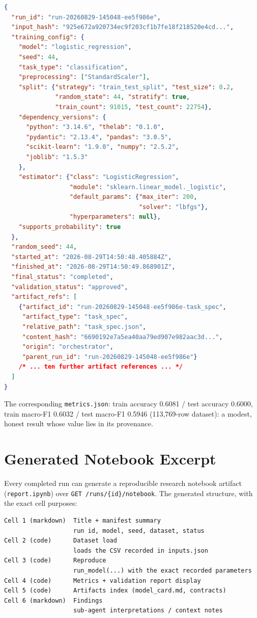 \begin{lstlisting}[language=json, caption={Real \texttt{manifest.json} (abridged).}, label={lst:anxmanifest}, style=cli]
{
  "run_id": "run-20260829-145048-ee5f986e",
  "input_hash": "925e672a920734ec9f203cf1b7fe18f218520e4cd...",
  "training_config": {
    "model": "logistic_regression",
    "seed": 44,
    "task_type": "classification",
    "preprocessing": ["StandardScaler"],
    "split": {"strategy": "train_test_split", "test_size": 0.2,
              "random_state": 44, "stratify": true,
              "train_count": 91015, "test_count": 22754},
    "dependency_versions": {
      "python": "3.14.6", "thelab": "0.1.0",
      "pydantic": "2.13.4", "pandas": "3.0.5",
      "scikit-learn": "1.9.0", "numpy": "2.5.2",
      "joblib": "1.5.3"
    },
    "estimator": {"class": "LogisticRegression",
                  "module": "sklearn.linear_model._logistic",
                  "default_params": {"max_iter": 200,
                                     "solver": "lbfgs"},
                  "hyperparameters": null},
    "supports_probability": true
  },
  "random_seed": 44,
  "started_at": "2026-08-29T14:50:48.405884Z",
  "finished_at": "2026-08-29T14:50:49.868901Z",
  "final_status": "completed",
  "validation_status": "approved",
  "artifact_refs": [
    {"artifact_id": "run-20260829-145048-ee5f986e-task_spec",
     "artifact_type": "task_spec",
     "relative_path": "task_spec.json",
     "content_hash": "6690192e7a5ea40aa79ed907e982aac3d...",
     "origin": "orchestrator",
     "parent_run_id": "run-20260829-145048-ee5f986e"}
    /* ... ten further artifact references ... */
  ]
}
\end{lstlisting}

The corresponding \texttt{metrics.json}: train accuracy 0.6081 / test accuracy 0.6000, train macro-F1 0.6032 / test macro-F1 0.5946 (113{,}769-row dataset): a modest, honest result whose value lies in its provenance.

\chapter{Generated Notebook Excerpt}
\label{anx:notebook}

Every completed run can generate a reproducible research notebook artifact (\texttt{report.}\allowbreak{}\texttt{ipynb}) over \texttt{GET /runs/}\allowbreak{}\texttt{\{id\}/}\allowbreak{}\texttt{notebook}. The generated structure, with the exact cell purposes:

\begin{lstlisting}[language={}, caption={Generated notebook structure (six cells, nbformat 4).}, label={lst:anxnotebook}, style=cli]
Cell 1 (markdown)  Title + manifest summary
                   run id, model, seed, dataset, status
Cell 2 (code)      Dataset load
                   loads the CSV recorded in inputs.json
Cell 3 (code)      Reproduce
                   run_model(...) with the exact recorded parameters
Cell 4 (code)      Metrics + validation report display
Cell 5 (code)      Artifacts index (model_card.md, contracts)
Cell 6 (markdown)  Findings
                   sub-agent interpretations / context notes
\end{lstlisting}

